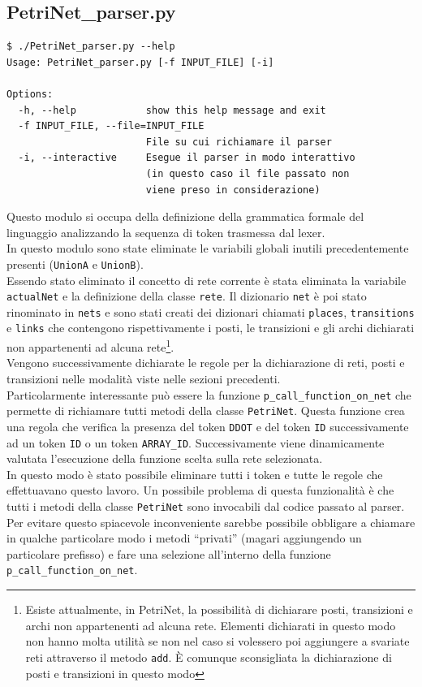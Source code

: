 \documentclass[italian,12pt]{book}
\begin{document}
\subsection{PetriNet\_parser.py}
\begin{verbatim}
$ ./PetriNet_parser.py --help
Usage: PetriNet_parser.py [-f INPUT_FILE] [-i] 

Options:
  -h, --help            show this help message and exit
  -f INPUT_FILE, --file=INPUT_FILE
                        File su cui richiamare il parser
  -i, --interactive     Esegue il parser in modo interattivo 
                        (in questo caso il file passato non 
                        viene preso in considerazione)
\end{verbatim}
Questo modulo si occupa della definizione della grammatica formale del linguaggio analizzando la sequenza di token trasmessa dal lexer.\\
In questo modulo sono state eliminate le variabili globali inutili precedentemente presenti ({\tt UnionA} e {\tt UnionB}).\\
Essendo stato eliminato il concetto di rete corrente è stata eliminata la variabile {\tt actualNet} e la definizione della classe {\tt rete}. Il dizionario {\tt net} è poi stato rinominato in {\tt nets} e sono stati creati dei dizionari chiamati {\tt places}, {\tt transitions} e {\tt links} che contengono rispettivamente i posti, le transizioni e gli archi dichiarati non appartenenti ad alcuna rete\footnote{Esiste attualmente, in PetriNet, la possibilità di dichiarare posti, transizioni e archi non appartenenti ad alcuna rete. Elementi dichiarati in questo modo non hanno molta utilità se non nel caso si volessero poi aggiungere a svariate reti attraverso il metodo {\tt  add}. È comunque sconsigliata la dichiarazione di posti e transizioni in questo modo}.\\
Vengono successivamente dichiarate le regole per la dichiarazione di reti, posti e transizioni nelle modalità viste nelle sezioni precedenti.\\
Particolarmente interessante può essere la funzione {\tt p\_call\_function\_on\_net} che permette di richiamare tutti metodi della classe {\tt PetriNet}. Questa funzione crea una regola che verifica la presenza del token {\tt DDOT} e del token {\tt ID} successivamente ad un token {\tt ID} o un token {\tt ARRAY\_ID}. Successivamente viene dinamicamente valutata l'esecuzione della funzione scelta sulla rete selezionata. \\
In questo modo è stato possibile eliminare tutti i token e tutte le regole che effettuavano questo lavoro. Un possibile problema di questa funzionalità è che tutti i metodi della classe {\tt PetriNet} sono invocabili dal codice passato al parser. Per evitare questo spiacevole inconveniente sarebbe possibile obbligare a chiamare in qualche particolare modo i metodi ``privati'' (magari aggiungendo un particolare prefisso) e fare una selezione all'interno della funzione {\tt p\_call\_function\_on\_net}.\\
\end{document}

